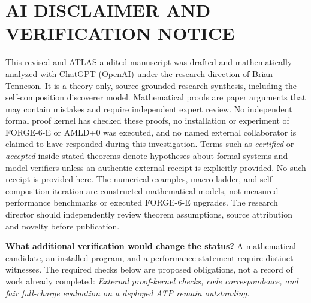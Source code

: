 \documentclass[11pt,letterpaper]{article}
\theoremstyle{definition}
\theoremstyle{remark}
\begin{document}
\section*{AI DISCLAIMER AND VERIFICATION NOTICE}
This revised and ATLAS-audited manuscript was drafted and mathematically analyzed with ChatGPT (OpenAI) under the research direction of Brian Tenneson. It is a theory-only, source-grounded research synthesis, including the self-composition discoverer model. Mathematical proofs are paper arguments that may contain mistakes and require independent expert review. No independent formal proof kernel has checked these proofs, no installation or experiment of FORGE-6-E or AMLD+0 was executed, and no named external collaborator is claimed to have responded during this investigation. Terms such as \emph{certified} or \emph{accepted} inside stated theorems denote hypotheses about formal systems and model verifiers unless an authentic external receipt is explicitly provided. No such receipt is provided here. The numerical examples, macro ladder, and self-composition iteration are constructed mathematical models, not measured performance benchmarks or executed FORGE-6-E upgrades. The research director should independently review theorem assumptions, source attribution and novelty before publication.

\bigskip
\noindent\textbf{What additional verification would change the status?}  A mathematical candidate, an installed program, and a performance statement require distinct witnesses. The required checks below are proposed obligations, not a record of work already completed:
\noindent\emph{External proof-kernel checks, code correspondence, and fair full-charge evaluation on a deployed ATP remain outstanding.}
\end{document}
